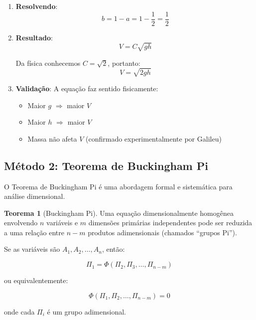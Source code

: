 \documentclass[12pt,a4paper,oneside]{book}
\theoremstyle{definition}
\newtheorem{theorem}[definition]{Teorema}
\begin{document}
\begin{enumerate}
    \item \textbf{Resolvendo}:
    \begin{equation}
        b = 1 - a = 1 - \frac{1}{2} = \frac{1}{2}
    \end{equation}

    \item \textbf{Resultado}:
    \begin{equation}
        V = C \sqrt{gh}
    \end{equation}

    Da física conhecemos $C = \sqrt{2}$, portanto:
    \begin{equation}
        V = \sqrt{2gh}
    \end{equation}

    \item \textbf{Validação}: A equação faz sentido fisicamente:
    \begin{itemize}
        \item Maior $g$ $\Rightarrow$ maior $V$ \checkmark
        \item Maior $h$ $\Rightarrow$ maior $V$ \checkmark
        \item Massa não afeta $V$ \checkmark (confirmado experimentalmente por Galileu)
    \end{itemize}
\end{enumerate}

\subsection{Método 2: Teorema de Buckingham Pi}

O Teorema de Buckingham Pi é uma abordagem formal e sistemática para análise dimensional.

\begin{theorem}[Buckingham Pi]
Uma equação dimensionalmente homogênea envolvendo $n$ variáveis e $m$ dimensões primárias independentes pode ser reduzida a uma relação entre $n - m$ produtos adimensionais (chamados ``grupos Pi'').

Se as variáveis são $A_1, A_2, \ldots, A_n$, então:

\begin{equation}
    \Pi_1 = \Phi(\Pi_2, \Pi_3, \ldots, \Pi_{n-m})
\end{equation}

ou equivalentemente:

\begin{equation}
    \Phi(\Pi_1, \Pi_2, \ldots, \Pi_{n-m}) = 0
\end{equation}

onde cada $\Pi_i$ é um grupo adimensional.
\end{theorem}
\end{document}
